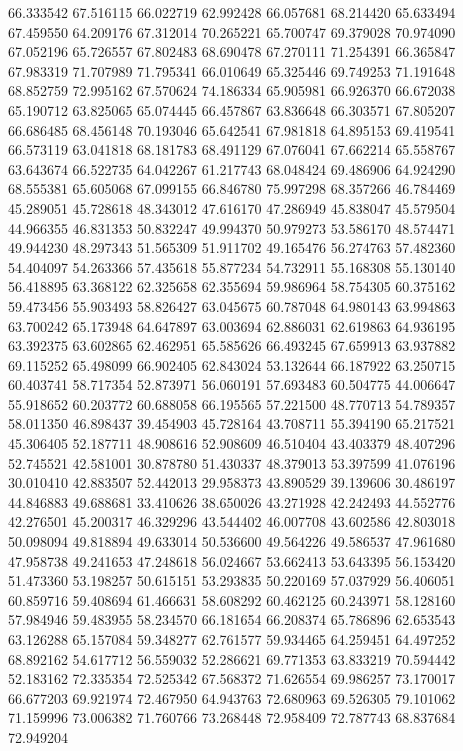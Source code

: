 66.333542
67.516115
66.022719
62.992428
66.057681
68.214420
65.633494
67.459550
64.209176
67.312014
70.265221
65.700747
69.379028
70.974090
67.052196
65.726557
67.802483
68.690478
67.270111
71.254391
66.365847
67.983319
71.707989
71.795341
66.010649
65.325446
69.749253
71.191648
68.852759
72.995162
67.570624
74.186334
65.905981
66.926370
66.672038
65.190712
63.825065
65.074445
66.457867
63.836648
66.303571
67.805207
66.686485
68.456148
70.193046
65.642541
67.981818
64.895153
69.419541
66.573119
63.041818
68.181783
68.491129
67.076041
67.662214
65.558767
63.643674
66.522735
64.042267
61.217743
68.048424
69.486906
64.924290
68.555381
65.605068
67.099155
66.846780
75.997298
68.357266
46.784469
45.289051
45.728618
48.343012
47.616170
47.286949
45.838047
45.579504
44.966355
46.831353
50.832247
49.994370
50.979273
53.586170
48.574471
49.944230
48.297343
51.565309
51.911702
49.165476
56.274763
57.482360
54.404097
54.263366
57.435618
55.877234
54.732911
55.168308
55.130140
56.418895
63.368122
62.325658
62.355694
59.986964
58.754305
60.375162
59.473456
55.903493
58.826427
63.045675
60.787048
64.980143
63.994863
63.700242
65.173948
64.647897
63.003694
62.886031
62.619863
64.936195
63.392375
63.602865
62.462951
65.585626
66.493245
67.659913
63.937882
69.115252
65.498099
66.902405
62.843024
53.132644
66.187922
63.250715
60.403741
58.717354
52.873971
56.060191
57.693483
60.504775
44.006647
55.918652
60.203772
60.688058
66.195565
57.221500
48.770713
54.789357
58.011350
46.898437
39.454903
45.728164
43.708711
55.394190
65.217521
45.306405
52.187711
48.908616
52.908609
46.510404
43.403379
48.407296
52.745521
42.581001
30.878780
51.430337
48.379013
53.397599
41.076196
30.010410
42.883507
52.442013
29.958373
43.890529
39.139606
30.486197
44.846883
49.688681
33.410626
38.650026
43.271928
42.242493
44.552776
42.276501
45.200317
46.329296
43.544402
46.007708
43.602586
42.803018
50.098094
49.818894
49.633014
50.536600
49.564226
49.586537
47.961680
47.958738
49.241653
47.248618
56.024667
53.662413
53.643395
56.153420
51.473360
53.198257
50.615151
53.293835
50.220169
57.037929
56.406051
60.859716
59.408694
61.466631
58.608292
60.462125
60.243971
58.128160
57.984946
59.483955
58.234570
66.181654
66.208374
65.786896
62.653543
63.126288
65.157084
59.348277
62.761577
59.934465
64.259451
64.497252
68.892162
54.617712
56.559032
52.286621
69.771353
63.833219
70.594442
52.183162
72.335354
72.525342
67.568372
71.626554
69.986257
73.170017
66.677203
69.921974
72.467950
64.943763
72.680963
69.526305
79.101062
71.159996
73.006382
71.760766
73.268448
72.958409
72.787743
68.837684
72.949204
